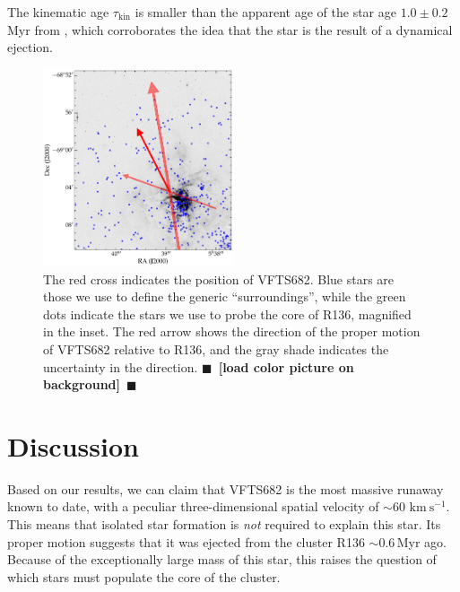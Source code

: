 \documentclass{aa}
\newcommand{\todo}[1]{{\large $\blacksquare$~\textbf{\color{red}[#1]}}~$\blacksquare$}
\newcommand{\kms}{{\,\mathrm{km\ s^{-1}}}}
\begin{document}
The kinematic age $\tau_\mathrm{kin}$ is smaller than the apparent age
of the star age $1.0\pm 0.2$\,Myr from \cite{schneider:18}, which
corroborates the idea that the star is the result of a dynamical
ejection. 

\begin{figure}[htbp]
  \centering
  \includegraphics[width=0.5\textwidth]{./figures/main_plot}  
  \caption{The red cross indicates the position of VFTS682. Blue stars
    are those we use to define the generic ``surroundings'', while the
    green dots indicate the stars we use to probe the core of R136,
    magnified in the inset. The red arrow shows the direction of the
    proper motion of VFTS682 relative to R136, and the gray shade
    indicates the uncertainty in the direction. \todo{load color picture on background}}
  \label{fig:main}
\end{figure}

\section{Discussion}
\label{sec:discussion}

Based on our results, we can claim that VFTS682 is the most massive
runaway known to date, with a peculiar three-dimensional spatial
velocity of $\sim$$60\,\kms$. This means that isolated star formation is
\emph{not} required to explain this star. Its proper motion suggests that it was ejected from the cluster R136
$\sim$$0.6$\,Myr ago. Because of the exceptionally large mass
of this star, this raises the question of which stars must populate
the core of the cluster.
\end{document}
